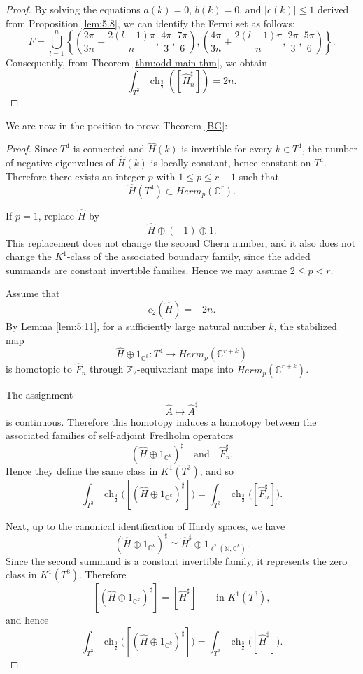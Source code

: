 \documentclass{amsart}
\theoremstyle{definition}
\theoremstyle{remark}
\begin{document}
\begin{proof}
By solving the equations $a(k) = 0$, $b(k) = 0$, and $|c(k)| \leq 1$ derived from Proposition \ref{lem:5.8}, we can identify the Fermi set as follows:
\[
F = \bigcup_{l=1}^{n} \left\{ \left( \frac{2\pi}{3n} + \frac{2(l-1)\pi}{n}, \frac{4\pi}{3}, \frac{7\pi}{6} \right),\left( \frac{4\pi}{3n} + \frac{2(l-1)\pi}{n}, \frac{2\pi}{3}, \frac{5\pi}{6} \right) \right\}.
\]
Consequently, from Theorem \ref{thm:odd main thm}, we obtain 
\[
\int_{T^3} \operatorname{ch}_{\frac{3}{2}}([\hat{H}_n^\sharp]) = 2n.
\]
\end{proof}

We are now in the position to prove Theorem \ref{BG}:

\begin{proof}
Since $T^4$ is connected and $\hat{H}(k)$ is invertible for every $k\in T^4$, the number of negative eigenvalues of $\hat{H}(k)$ is locally constant, hence constant on $T^4$. Therefore there exists an integer $p$ with $1\le p\le r-1$ such that
\[
\hat{H}(T^4)\subset Herm_p(\mathbb{C}^r).
\]

If $p=1$, replace $\hat{H}$ by
\[
\hat{H}\oplus (-1)\oplus 1.
\]
This replacement does not change the second Chern number, and it also does not change the $K^1$-class of the associated boundary family, since the added summands are constant invertible families. Hence we may assume $2\le p<r$.

Assume that
\[
c_2(\hat{H})=-2n.
\]
By Lemma \ref{lem:5:11}, for a sufficiently large natural number $k$, the stabilized map
\[
\hat{H}\oplus 1_{\mathbb{C}^k}:T^4\to Herm_p(\mathbb{C}^{r+k})
\]
is homotopic to $\hat{F}_n$ through $\mathbb{Z}_2$-equivariant maps into $Herm_p(\mathbb{C}^{r+k})$.

The assignment
\[
\hat{A}\longmapsto \hat{A}^{\sharp}
\]
is continuous. Therefore this homotopy induces a homotopy between the associated families of self-adjoint Fredholm operators
\[
(\hat{H}\oplus 1_{\mathbb{C}^k})^{\sharp}
\quad\text{and}\quad
\hat{F}_n^{\sharp}.
\]
Hence they define the same class in $K^1(T^3)$, and so
\[
\int_{T^3} \operatorname{ch}_{\frac{3}{2}}\bigl([(\hat{H}\oplus 1_{\mathbb{C}^k})^{\sharp}]\bigr)
=
\int_{T^3} \operatorname{ch}_{\frac{3}{2}}\bigl([\hat{F}_n^{\sharp}]\bigr).
\]

Next, up to the canonical identification of Hardy spaces, we have
\[
(\hat{H}\oplus 1_{\mathbb{C}^k})^{\sharp}
\cong
\hat{H}^{\sharp}\oplus 1_{\ell^2(\mathbb{N},\mathbb{C}^k)}.
\]
Since the second summand is a constant invertible family, it represents the zero class in $K^1(T^3)$. Therefore
\[
[(\hat{H}\oplus 1_{\mathbb{C}^k})^{\sharp}]
=
[\hat{H}^{\sharp}]
\qquad\text{in }K^1(T^3),
\]
and hence
\[
\int_{T^3} \operatorname{ch}_{\frac{3}{2}}\bigl([(\hat{H}\oplus 1_{\mathbb{C}^k})^{\sharp}]\bigr)
=
\int_{T^3} \operatorname{ch}_{\frac{3}{2}}\bigl([\hat{H}^{\sharp}]\bigr).
\]


\end{proof}
\end{document}
